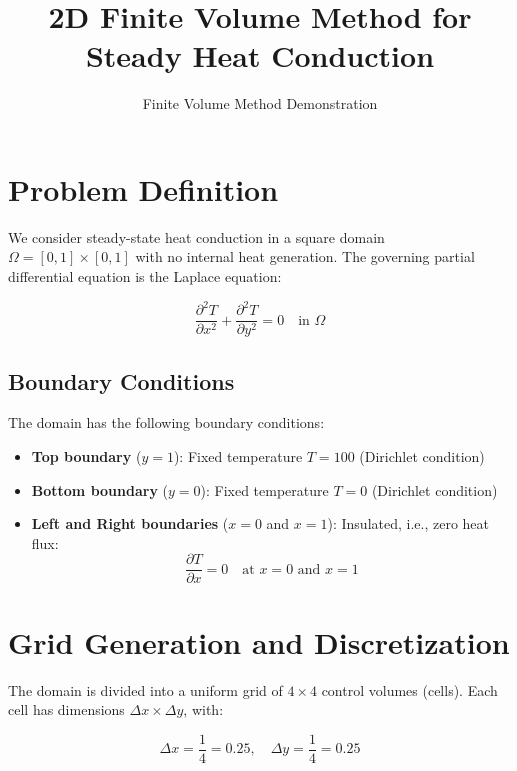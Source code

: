 \documentclass{article}
\title{2D Finite Volume Method for Steady Heat Conduction}
\author{Finite Volume Method Demonstration}
\date{}
\begin{document}
\maketitle

\section{Problem Definition}

We consider steady-state heat conduction in a square domain $\Omega = [0,1] \times [0,1]$ with no internal heat generation. The governing partial differential equation is the Laplace equation:

\begin{equation}
\frac{\partial^2 T}{\partial x^2} + \frac{\partial^2 T}{\partial y^2} = 0 \quad \text{in } \Omega
\label{eq:laplace}
\end{equation}

\subsection{Boundary Conditions}

The domain has the following boundary conditions:
\begin{itemize}
    \item \textbf{Top boundary} ($y=1$): Fixed temperature $T = 100$ (Dirichlet condition)
    \item \textbf{Bottom boundary} ($y=0$): Fixed temperature $T = 0$ (Dirichlet condition)
    \item \textbf{Left and Right boundaries} ($x=0$ and $x=1$): Insulated, i.e., zero heat flux:
    \begin{equation}
    \frac{\partial T}{\partial x} = 0 \quad \text{at } x=0 \text{ and } x=1
    \end{equation}
\end{itemize}

\section{Grid Generation and Discretization}

The domain is divided into a uniform grid of $4 \times 4$ control volumes (cells). Each cell has dimensions $\Delta x \times \Delta y$, with:

\begin{equation}
\Delta x = \frac{1}{4} = 0.25, \quad \Delta y = \frac{1}{4} = 0.25
\end{equation}
\end{document}
